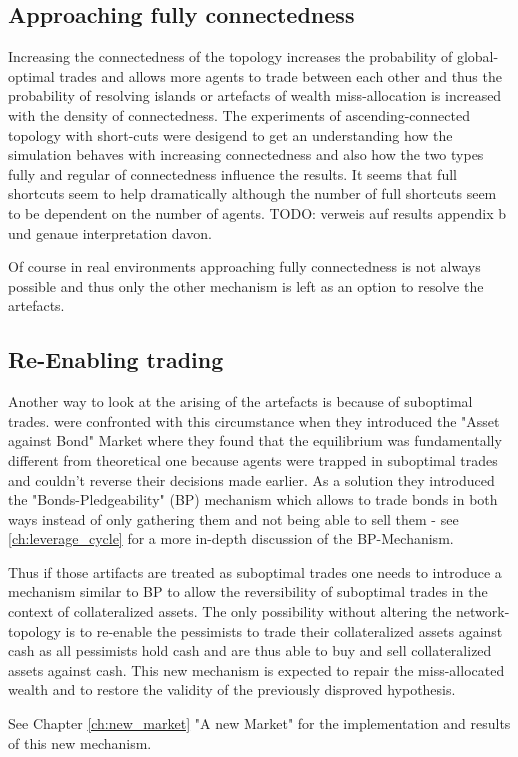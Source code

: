 \documentclass[Bachelorarbeit.tex]{subfiles}
\begin{document}
\subsection{Approaching fully connectedness}
Increasing the connectedness of the topology increases the probability of global-optimal trades and allows more agents to trade between each other and thus the probability of resolving islands or artefacts of wealth miss-allocation is increased with the density of connectedness.
The experiments of ascending-connected topology with short-cuts were desigend to get an understanding how the simulation behaves with increasing connectedness and also how the two types fully and regular of connectedness influence the results.
It seems that full shortcuts seem to help dramatically although the number of full shortcuts seem to be dependent on the number of agents.
TODO: verweis auf results appendix b und genaue interpretation davon.

Of course in real environments approaching fully connectedness is not always possible and thus only the other mechanism is left as an option to resolve the artefacts.

\subsection{Re-Enabling trading}
Another way to look at the arising of the artefacts is because of suboptimal trades. \cite{Breuer2015} were confronted with this circumstance when they introduced the "Asset against Bond" Market where they found that the equilibrium was fundamentally different from theoretical one because agents were trapped in suboptimal trades and couldn't reverse their decisions made earlier. As a solution they introduced the "Bonds-Pledgeability" (BP) mechanism which allows to trade bonds in both ways instead of only gathering them and not being able to sell them - see \ref{ch:leverage_cycle} for a more in-depth discussion of the BP-Mechanism.

\medskip 

Thus if those artifacts are treated as suboptimal trades one needs to introduce a mechanism similar to BP to allow the reversibility of suboptimal trades in the context of collateralized assets. The only possibility without altering the network-topology is to re-enable the pessimists to trade their collateralized assets against cash as all pessimists hold cash and are thus able to buy and sell collateralized assets against cash. This new mechanism is expected to repair the miss-allocated wealth and to restore the validity of the previously disproved hypothesis.

\medskip 

See Chapter \ref{ch:new_market} "A new Market" for the implementation and results of this new mechanism.
\end{document}
